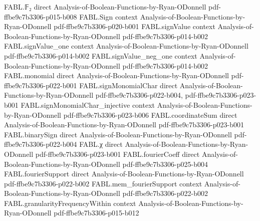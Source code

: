\begin{theorem}
\label{FABL.restrictionFourierCoeff_eq_sum}
\leanok
{}
\proofstep
  {FABL.𝔽₂}
  {direct}
  {Analysis-of-Boolean-Functions-by-Ryan-ODonnell}
  {pdf-ffbe9c7b3306-p015-b008}
\proofstep
  {FABL.Sign}
  {context}
  {Analysis-of-Boolean-Functions-by-Ryan-ODonnell}
  {pdf-ffbe9c7b3306-p020-b001}
\proofstep
  {FABL.signValue}
  {context}
  {Analysis-of-Boolean-Functions-by-Ryan-ODonnell}
  {pdf-ffbe9c7b3306-p014-b002}
\proofstep
  {FABL.signValue_one}
  {context}
  {Analysis-of-Boolean-Functions-by-Ryan-ODonnell}
  {pdf-ffbe9c7b3306-p014-b002}
\proofstep
  {FABL.signValue_neg_one}
  {context}
  {Analysis-of-Boolean-Functions-by-Ryan-ODonnell}
  {pdf-ffbe9c7b3306-p014-b002}
\proofstep
  {FABL.monomial}
  {direct}
  {Analysis-of-Boolean-Functions-by-Ryan-ODonnell}
  {pdf-ffbe9c7b3306-p022-b001}
\proofstep
  {FABL.signMonomialChar}
  {direct}
  {Analysis-of-Boolean-Functions-by-Ryan-ODonnell}
  {pdf-ffbe9c7b3306-p022-b004,
    pdf-ffbe9c7b3306-p023-b001}
\proofstep
  {FABL.signMonomialChar_injective}
  {context}
  {Analysis-of-Boolean-Functions-by-Ryan-ODonnell}
  {pdf-ffbe9c7b3306-p023-b006}
\proofstep
  {FABL.coordinateSum}
  {direct}
  {Analysis-of-Boolean-Functions-by-Ryan-ODonnell}
  {pdf-ffbe9c7b3306-p023-b001}
\proofstep
  {FABL.binarySign}
  {direct}
  {Analysis-of-Boolean-Functions-by-Ryan-ODonnell}
  {pdf-ffbe9c7b3306-p022-b004}
\proofstep
  {FABL.χ}
  {direct}
  {Analysis-of-Boolean-Functions-by-Ryan-ODonnell}
  {pdf-ffbe9c7b3306-p023-b001}
\proofstep
  {FABL.fourierCoeff}
  {direct}
  {Analysis-of-Boolean-Functions-by-Ryan-ODonnell}
  {pdf-ffbe9c7b3306-p025-b004}
\proofstep
  {FABL.fourierSupport}
  {direct}
  {Analysis-of-Boolean-Functions-by-Ryan-ODonnell}
  {pdf-ffbe9c7b3306-p022-b002}
\proofstep
  {FABL.mem_fourierSupport}
  {context}
  {Analysis-of-Boolean-Functions-by-Ryan-ODonnell}
  {pdf-ffbe9c7b3306-p022-b002}
\proofstep
  {FABL.granularityFrequencyWithin}
  {context}
  {Analysis-of-Boolean-Functions-by-Ryan-ODonnell}
  {pdf-ffbe9c7b3306-p015-b012}

\end{theorem}
